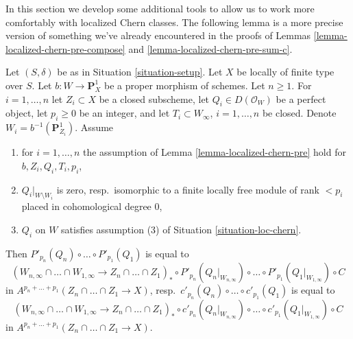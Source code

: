 \noindent
In this section we develop some additional tools to allow us to work
more comfortably with localized Chern classes. The following lemma
is a more precise version of something we've already encountered in
the proofs of Lemmas \ref{lemma-localized-chern-pre-compose} and
\ref{lemma-localized-chern-pre-sum-c}.

\begin{lemma}
\label{lemma-homomorphism-final}
Let $(S, \delta)$ be as in Situation \ref{situation-setup}. Let $X$ be
locally of finite type over $S$. Let $b : W \longrightarrow \mathbf{P}^1_X$
be a proper morphism of schemes. Let $n \geq 1$. For $i = 1, \ldots, n$
let $Z_i \subset X$ be a closed subscheme, let $Q_i \in D(\mathcal{O}_W)$
be a perfect object, let $p_i \geq 0$ be an integer, and let
$T_i \subset W_\infty$, $i = 1, \ldots, n$ be closed.
Denote $W_i = b^{-1}(\mathbf{P}^1_{Z_i})$. Assume
\begin{enumerate}
\item for $i = 1, \ldots, n$ the assumption of
Lemma \ref{lemma-localized-chern-pre} hold for
$b, Z_i, Q_i, T_i, p_i$,
\item $Q_i|_{W \setminus W_i}$ is zero, resp.\ isomorphic to a finite
locally free module of rank $< p_i$ placed in cohomological degree $0$,
\item $Q_i$ on $W$ satisfies
assumption (3) of Situation \ref{situation-loc-chern}.
\end{enumerate}
Then $P'_{p_n}(Q_n) \circ \ldots \circ P'_{p_1}(Q_1)$ is equal to
$$
(W_{n, \infty} \cap \ldots \cap W_{1, \infty} \to
Z_n \cap \ldots \cap Z_1)_* \circ
P'_{p_n}(Q_n|_{W_{n, \infty}}) \circ \ldots \circ P'_{p_1}(Q_1|_{W_{1, \infty}})
\circ C
$$
in $A^{p_n + \ldots + p_1}(Z_n \cap \ldots \cap Z_1 \to X)$,
resp.\ $c'_{p_n}(Q_n) \circ \ldots \circ c'_{p_1}(Q_1)$ is equal to
$$
(W_{n, \infty} \cap \ldots \cap W_{1, \infty} \to
Z_n \cap \ldots \cap Z_1)_* \circ
c'_{p_n}(Q_n|_{W_{n, \infty}}) \circ \ldots \circ c'_{p_1}(Q_1|_{W_{1, \infty}})
\circ C
$$
in $A^{p_n + \ldots + p_1}(Z_n \cap \ldots \cap Z_1 \to X)$.
\end{lemma}

